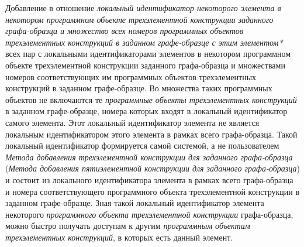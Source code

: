 \begin{SCn}
\begin{scnsubstruct}
\begin{scnsubstruct}
\begin{scnsubstruct}
\begin{scnsubstruct}
\begin{scnsubstruct}
\begin{scnsubstruct}
\begin{scnsubstruct}
\begin{scnsubstruct}
{\begin{scnitemize}
				\item Добавление в отношение \textit{локальный идентификатор некоторого элемента в некотором программном объекте трехэлементной конструкции заданного графа-образца и множество всех номеров программных объектов трехэлементных конструкций в заданном графе-образце с этим элементом*} всех пар с локальными идентификаторами элементов в некотором программном объекте трехэлементной конструкции заданного графа-образца и множествами номеров соответствующих им программных объектов трехэлементных конструкций в заданном графе-образце. Во множества таких программных объектов не включаются те \textit{программные объекты трехэлементных конструкций} в заданном графе-образце, номера которых входят в локальный идентификатор самого элемента. Этот локальный идентификатор элемента не является локальным идентификатором этого элемента в рамках всего графа-образца. Такой локальный идентификатор формируется самой системой, а не пользователем \textit{Метода добавления трехэлементной конструкции для заданного графа-образца} (\textit{Метода добавления пятиэлементной конструкции для заданного графа-образца}) и состоит из локального идентификатора элемента в рамках всего графа-образца и номера соответствующего программного объекта трехэлементной конструкции в заданном графе-образце. Зная такой локальный идентификатор элемента некоторого \textit{программного объекта трехэлементной конструкции} графа-образца, можно быстро получать доступам к другим \textit{программным объектам трехэлементных конструкций}, в которых есть данный элемент.

\end{scnitemize}}
\end{scnsubstruct}
\end{scnsubstruct}
\end{scnsubstruct}
\end{scnsubstruct}
\end{scnsubstruct}
\end{scnsubstruct}
\end{scnsubstruct}
\end{scnsubstruct}
\end{SCn}
